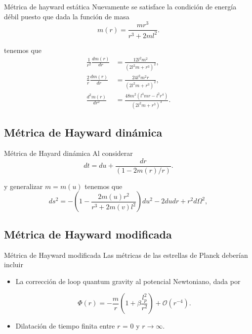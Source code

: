 \documentclass[t]{beamer}
\numberwithin{equation}{section}
\begin{document}
\begin{frame}{Métrica de hayward estática}
\vspace*{\fill}
Nuevamente se satisface la condición de energía débil puesto que dada la función de masa
\begin{equation}
\label{hayward mass}
m(r) =  \frac{mr^3}{r^3 + 2ml^2}.
\end{equation}

tenemos que
\begin{equation}
\begin{aligned}
\frac{1}{r^2}\frac{dm(r)}{dr} &= \frac{12 l^2 m^2}{\left(2 l^2 m+r^3\right)^2},\\
\frac{2}{r}\frac{dm(r)}{dr} &= \frac{24 l^2 m^2 r}{\left(2 l^2 m+r^3\right)^2},\\
\frac{d^2m(r)}{dr^2} &= \frac{48 m^2 \left(l^4 m r-l^2 r^4\right)}{\left(2 l^2 m+r^3\right)^3}.
\end{aligned}
\end{equation}
\end{frame}


\subsection{Métrica de Hayward dinámica}

\begin{frame}{Métrica de Hayard dinámica}
\vspace*{\fill}
Al considerar 
\begin{equation}
dt = du + \frac{dr}{(1 - 2m(r)/r)}.
\end{equation}

y generalizar $m = m(u)$ tenemos que 
\begin{equation}
\label{hayward-tortoise}
ds^2 = -\left( 1 - \frac{2m(u)r^2}{r^3 + 2m(v)l^2} \right) du^2 - 2dudr + r^2d\Omega ^2,
\end{equation}

\end{frame}


\subsection{Métrica de Hayward modificada}

\begin{frame}{Métrica de Hayward modificada}
\vspace*{\fill}
Las métricas de las estrellas de Planck deberían incluir

\begin{itemize}
\item La corrección de loop quantum gravity al potencial Newtoniano, dada por

\begin{equation}
\label{newF}
\Phi (r) = -\frac{m}{r} \left( 1 + \beta \frac{l_{p}^2}{r^2} \right) + \mathcal{O}(r^{-4}).
\end{equation}

\item Dilatación de tiempo finita entre $r$ = 0 y $r \to \infty$.
\end{itemize}

\end{frame}
\end{document}
